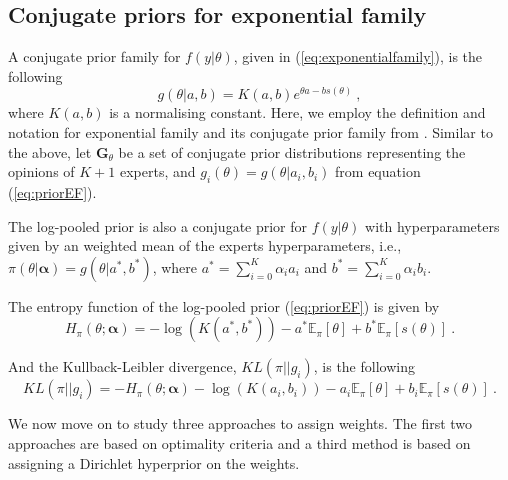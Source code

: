 \documentclass[a4paper, notitlepage, 10pt]{article}
\begin{document}
\subsection*{Conjugate priors for exponential family}

A conjugate prior family for $f(y|\theta)$, given in (\ref{eq:exponentialfamily}), is the following
\begin{equation}
\label{eq:priorEF}
g(\theta | a, b) = K(a,b) e^{\theta a - b s(\theta)} \: ,
\end{equation}
where $K(a,b)$ is a normalising constant.
Here, we employ the definition and notation for exponential family and its conjugate prior family from \citet[chapter 3]{robert2001}. %
Similar to the above, let $\mathbf{G}_{\theta}$ be a set of conjugate prior distributions representing the opinions of $K+1$ experts, and $g_i(\theta) = g(\theta | a_i, b_i)$ from equation (\ref{eq:priorEF}).

The log-pooled prior is also a conjugate prior for $f(y|\theta)$ with hyperparameters given by an weighted mean of the experts hyperparameters, i.e., $\pi(\theta|\boldsymbol\alpha) = g(\theta | a^*, b^* )$, where $a^* = \sum_{i=0}^K \alpha_i a_i$ and $b^* = \sum_{i=0}^K \alpha_i b_i$.

The entropy function of the log-pooled prior (\ref{eq:priorEF}) is given by
\begin{equation}
\label{eq:entropypriorEF}
H_\pi(\theta; \boldsymbol\alpha) = - \log (K(a^*, b^*))  -  a^*  \mathbb{E}_\pi[\theta]  +  b^*  \mathbb{E}_\pi[s(\theta)] \: .
\end{equation}

And the Kullback-Leibler divergence, $KL(\pi || g_i )$, is the following
\begin{equation}
\label{eq:KLpriorEF}
KL( \pi || g_i ) = - H_\pi(\theta; \boldsymbol\alpha) - \log( K(a_i,b_i)) - a_i \mathbb{E}_\pi[\theta] + b_i \mathbb{E}_\pi[s(\theta)] \: .
\end{equation}

We now move on to study three approaches to assign weights.
The first two approaches are based on optimality criteria and a third method is based on assigning a Dirichlet hyperprior on the weights.
\end{document}
